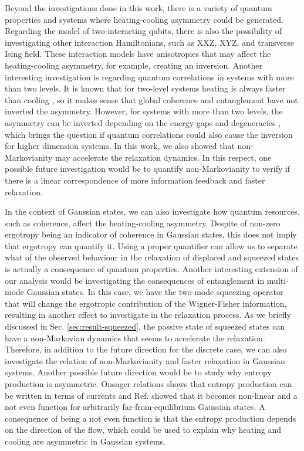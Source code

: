 Beyond the investigations done in this work, there is a variety of quantum properties and systems where heating-cooling asymmetry could be generated. Regarding the model of two-interacting qubits, there is also the possibility of investigating other interaction Hamiltonians, such as XXZ, XYZ, and transverse Ising field. These interaction models have anisotropies that may affect the heating-cooling asymmetry, for example, creating an inversion. Another interesting investigation is regarding quantum correlations in systems with more than two levels. It is known that for two-level systems heating is always faster than cooling \cite{vu-2021}, so it makes sense that global coherence and entanglement have not inverted the asymmetry. However, for systems with more than two levels, the asymmetry can be inverted depending on the energy gaps and degeneracies \cite{vu-2021}, which brings the question if quantum correlations could also cause the inversion for higher dimension systems. In this work, we also showed that non-Markovianity may accelerate the relaxation dynamics. In this respect, one possible future investigation would be to quantify non-Markovianity to verify if there is a linear correspondence of more information feedback and faster relaxation.


In the context of Gaussian states, we can also investigate how quantum resources, such as coherence, affect the heating-cooling asymmetry. Despite of non-zero ergotropy being an indicator of coherence in Gaussian states, this does not imply that ergotropy can quantify it. Using a proper quantifier can allow us to separate what of the observed behaviour in the relaxation of displaced and squeezed states is actually a consequence of quantum properties. Another interesting extension of our analysis would be investigating the consequences of entanglement in multi-mode Gaussian states. In this case, we have the two-mode squeezing operator that will change the ergotropic contribution of the Wigner-Fisher information, resulting in another effect to investigate in the relaxation process. As we briefly discussed in Sec. \ref{sec:result-squeezed}, the passive state of squeezed states can have a non-Markovian dynamics that seems to accelerate the relaxation. Therefore, in addition to the future direction for the discrete case, we can also investigate the relation of non-Markovianity and faster relaxation in Gaussian systems. Another possible future direction would be to study why entropy production is asymmetric. Onsager relations shows that entropy production can be written in terms of currents and  Ref. \cite{landi-2020} showed that it becomes non-linear and a not even function for arbitrarily far-from-equilibrium Gaussian states. A consequence of being a not even function is that the entropy production depends on the direction of the flow, which could be used to explain why heating and cooling are asymmetric in Gaussian systems.


